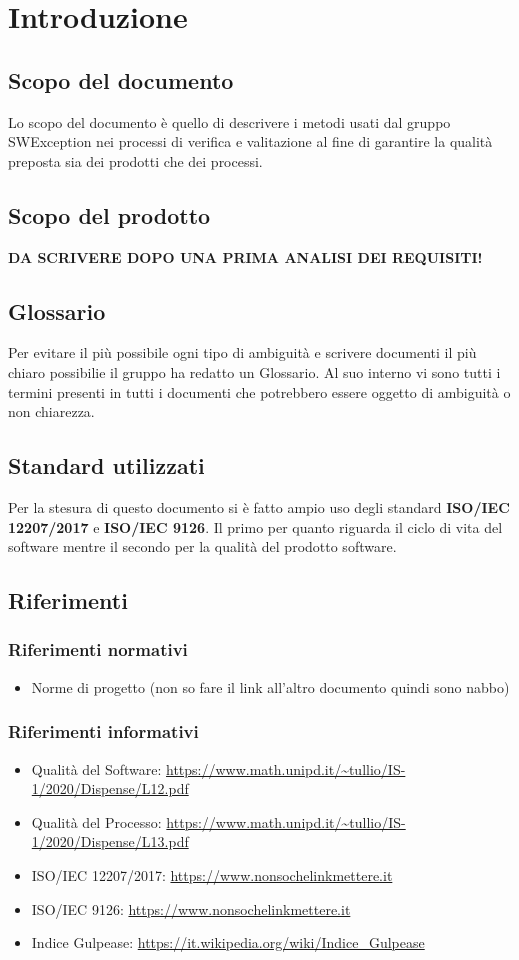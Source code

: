 \section{Introduzione}
\subsection{Scopo del documento}
Lo scopo del documento è quello di descrivere i metodi usati dal gruppo SWException nei processi di verifica e valitazione al fine di garantire la qualità preposta sia dei prodotti che dei processi.
\subsection{Scopo del prodotto}
\textbf{DA SCRIVERE DOPO UNA PRIMA ANALISI DEI REQUISITI!}
\subsection{Glossario}
Per evitare il più possibile ogni tipo di ambiguità e scrivere documenti il più chiaro possibilie il gruppo ha redatto un Glossario. Al suo interno vi sono tutti i termini presenti in tutti i documenti che potrebbero essere oggetto di ambiguità o non chiarezza.
\subsection{Standard utilizzati}
Per la stesura di questo documento si è fatto ampio uso degli standard \textbf{ISO/IEC 12207/2017} e \textbf{ISO/IEC 9126}. Il primo per quanto riguarda il ciclo di vita del software mentre il secondo per la qualità del prodotto software.
\subsection{Riferimenti}
\subsubsection{Riferimenti normativi}
\begin{itemize}
    \item Norme di progetto (non so fare il link all'altro documento quindi sono nabbo)
\end{itemize}
\subsubsection{Riferimenti informativi}
\begin{itemize}
    \item Qualità del Software: \url{https://www.math.unipd.it/~tullio/IS-1/2020/Dispense/L12.pdf}
    \item Qualità del Processo: \url{https://www.math.unipd.it/~tullio/IS-1/2020/Dispense/L13.pdf}
    \item ISO/IEC 12207/2017: \url{https://www.nonsochelinkmettere.it}
    \item ISO/IEC 9126: \url{https://www.nonsochelinkmettere.it}
    \item Indice Gulpease: \url{https://it.wikipedia.org/wiki/Indice_Gulpease}
\end{itemize}
